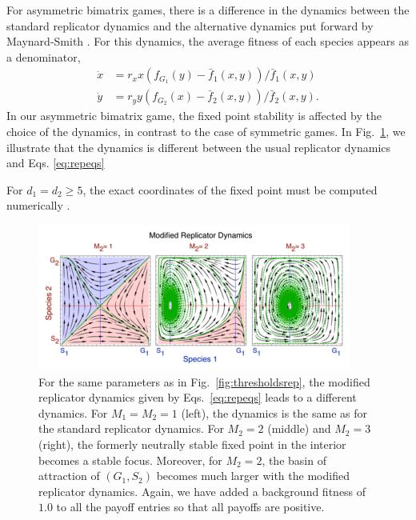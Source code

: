 \documentclass[a4paper]{scrartcl}
\begin{document}
For asymmetric bimatrix games, there is a difference in the dynamics between the standard replicator dynamics and the 
alternative dynamics put forward by Maynard-Smith \citep{maynard-smith:1982to}.
For this dynamics, the average fitness of each species appears as a denominator,
\begin{align}
\dot{x} &= r_x x \left(f_{G_1}(y) -  \bar{f}_1(x,y) \right)/\bar{f}_1(x,y) \nonumber \\
\dot{y} &= r_y y \left(f_{G_2}(x) -  \bar{f}_2(x,y) \right)/\bar{f}_2(x,y).
\label{eq:repeqs}
\end{align}
In our asymmetric bimatrix game, the fixed point stability is affected by the choice of the dynamics, in contrast to the case of symmetric games. 
In Fig.\ \ref{fig:thresholdsmodrep}, we illustrate that the dynamics is different between the usual 
replicator dynamics and Eqs. \ref{eq:repeqs}

For $d_1=d_2 \geq 5$, the exact coordinates of the fixed point must be computed numerically \citep{abel:1824aa,stewart:2004aa}.

\begin{figure}
\begin{center}
\includegraphics[width=\linewidth]{modifiedrepdyn.eps}
\end{center}
\caption{
For the same parameters as in Fig.\ \ref{fig:thresholdsrep}, the modified replicator dynamics given by Eqs.\ \ref{eq:repeqs} leads to a different dynamics.
For $M_1=M_2=1$ (left), the dynamics is the same as for the standard replicator dynamics. 
For $M_2=2$ (middle) and $M_2=3$ (right), the formerly neutrally stable fixed point in the interior becomes a stable focus. 
Moreover, for $M_2=2$, the basin of attraction of $(G_1,S_2)$ becomes much larger with the modified replicator dynamics. 
Again, we have added a background fitness of $1.0$ to all the payoff entries so that all payoffs are positive.
}
\label{fig:thresholdsmodrep}
\end{figure}
\end{document}
